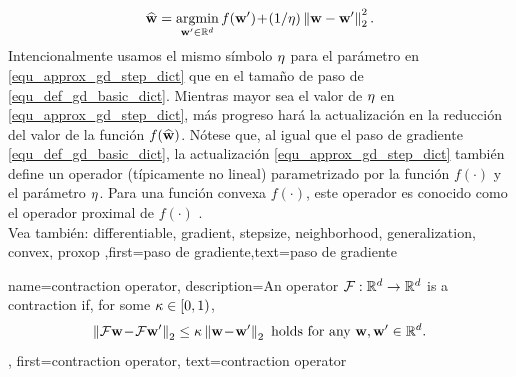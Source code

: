 {{ \begin{align} 
 \label{equ_approx_gd_step_dict}
 \widehat{{\bf w}} = \operatorname*{argmin}_{{\bf w}' \in \mathbb{R}^{d}} f({\bf w}')\!+\!(1/\eta)\left\Vert {{\bf w}-{\bf w}'} \right\Vert_{2}^2. 
 \end{align}
 Intencionalmente usamos el mismo símbolo $\eta$ para el parámetro en \eqref{equ_approx_gd_step_dict} 
 que en el tamaño de paso de \eqref{equ_def_gd_basic_dict}. Mientras mayor sea el valor de $\eta$ en 
 \eqref{equ_approx_gd_step_dict}, más progreso hará la actualización en la reducción del valor de la función $f(\widehat{{\bf w}})$. 
 Nótese que, al igual que el paso de gradiente \eqref{equ_def_gd_basic_dict}, 
 la actualización \eqref{equ_approx_gd_step_dict} también define un operador (típicamente no lineal)  
 parametrizado por la función $f(\cdot)$ y el parámetro $\eta$. Para una función convexa  
 $f(\cdot)$, este operador es conocido como el operador proximal de $f(\cdot)$ \cite{ProximalMethods}. 
 \\
		Vea también: \gls{differentiable}, \gls{gradient}, \gls{stepsize}, \gls{neighborhood}, \gls{generalization}, \gls{convex}, \gls{proxop} },first={paso de gradiente},text={paso de gradiente}}

		{name={contraction operator},
			description={An operator $\mathcal{F}: \mathbb{R}^{d} \rightarrow \mathbb{R}^{d}$
				is a contraction if, for some $\kappa \in [0,1)$,
				\begin{equation} 
					\nonumber
					\left\Vert { \mathcal{F}{\bf w}\!-\!\mathcal{F}{\bf w}'} \right\Vert_{2}  \leq  \kappa	\left\Vert {{\bf w}\!-\!{\bf w}'} \right\Vert_{2} \mbox{ holds for any } {\bf w},{\bf w}' \in \mathbb{R}^{d}.
				\end{equation}
			},
			first={contraction operator},
			text={contraction operator} 
			
			
		}
			
